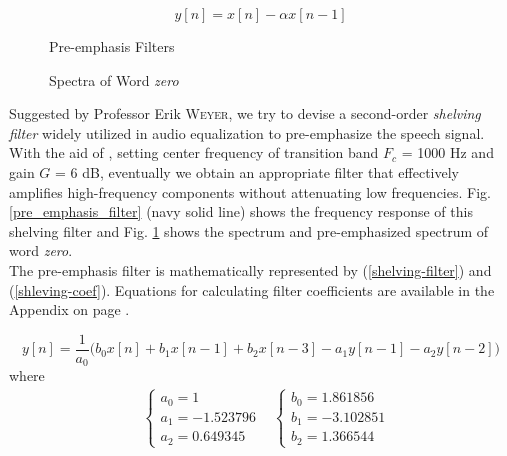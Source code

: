 \begin{equation}
\label{high-pass-filter}
y[n] = x[n] - \alpha x[n-1]
\end{equation}

\begin{figure}[H]
\begin{minipage}[t]{0.5\linewidth}
\centering
{}
\caption{Pre-emphasis Filters}
\label{pre_emphasis_filter}
\end{minipage}
\begin{minipage}[t]{0.5\linewidth}
\centering
{}
\caption{Spectra of Word \textit{zero}}
\label{zero_fft}
\end{minipage}
\end{figure}

Suggested by Professor Erik \textsc{Weyer}, we try to devise a second-order \textit{shelving filter} widely utilized in audio equalization to pre-emphasize the speech signal. With the aid of \cite{DAFX_book}, setting center frequency of transition band $F_c$ = 1000 Hz and gain $G$ = 6 dB, eventually we obtain an appropriate filter that effectively amplifies high-frequency components without attenuating low frequencies. Fig. \ref{pre_emphasis_filter} (\textcolor{navy_matlab}{navy} solid line) shows the frequency response of this shelving filter and Fig. \ref{zero_fft} shows the spectrum and pre-emphasized spectrum of word \textit{zero}.\\

The pre-emphasis filter is mathematically represented by (\ref{shelving-filter}) and (\ref{shleving-coef}). Equations for calculating filter coefficients are available in the Appendix on page \pageref{shelving-appendix}.

\begin{equation}
\label{shelving-filter}
y[n] = \frac{1}{a_0} \Big( b_0 x[n] + b_1 x[n-1] + b_2 x[n-3] - a_1 y[n-1] - a_2 y[n-2] \Big)
\end{equation}
where
\begin{align}
\label{shleving-coef}
&\begin{cases}
a_0 = 1\\
a_1 = -1.523796\\
a_2 = 0.649345
\end{cases}
&\begin{cases}
b_0 = 1.861856\\
b_1 = -3.102851\\
b_2 = 1.366544
\end{cases}
\end{align}

